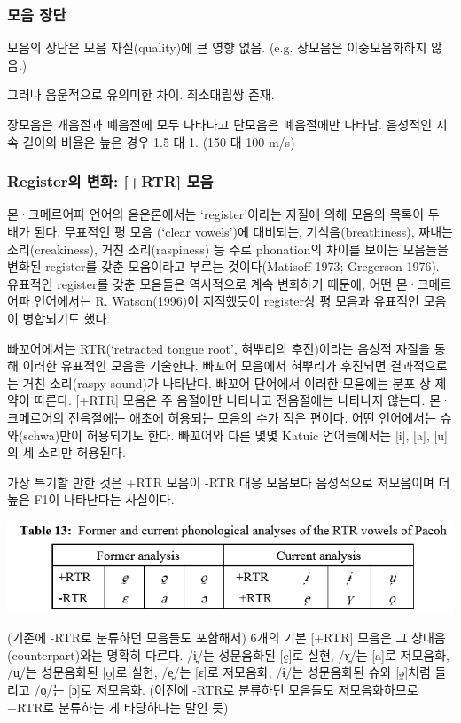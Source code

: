 \subsubsection{모음 장단}
모음의 장단은 모음 자질(quality)에 큰 영향 없음. (e.g. 장모음은 이중모음화하지 않음.)

그러나 음운적으로 유의미한 차이. 최소대립쌍 존재.

장모음은 개음절과 폐음절에 모두 나타나고 단모음은 폐음절에만 나타남. 음성적인 지속 길이의 비율은 높은 경우 1.5 대 1. (150 대 100 m/s)

\subsubsection{Register의 변화:  [+RTR] 모음}
몬·크메르어파 언어의 음운론에서는 `register'이라는 자질에 의해 모음의 목록이 두 배가 된다. 무표적인 평 모음 (`clear vowels')에 대비되는, 기식음(breathiness), 짜내는 소리(creakiness), 거친 소리(raspiness) 등 주로 phonation의 차이를 보이는 모음들을 변화된 register를 갖춘 모음이라고 부르는 것이다(Matisoff 1973; Gregerson 1976). 유표적인 register를 갖춘 모음들은 역사적으로 계속 변화하기 때문에, 어떤 몬·크메르어파 언어에서는 R. Watson(1996)이 지적했듯이 register상 평 모음과 유표적인 모음이 병합되기도 했다.

빠꼬어에서는 RTR(`retracted tongue root', 혀뿌리의 후진)이라는 음성적 자질을 통해 이러한 유표적인 모음을 기술한다. 빠꼬어 모음에서 혀뿌리가 후진되면 결과적으로는 거친 소리(raspy sound)가 나타난다. 빠꼬어 단어에서 이러한 모음에는 분포 상 제약이 따른다. [+RTR] 모음은 주 음절에만 나타나고 전음절에는 나타나지 않는다. 몬·크메르어의 전음절에는 애초에 허용되는 모음의 수가 적은 편이다. 어떤 언어에서는 슈와(schwa)만이 허용되기도 한다. 빠꼬어와 다른 몇몇 Katuic 언어들에서는 [i], [a], [u]의 세 소리만 허용된다.

가장 특기할 만한 것은 +RTR 모음이 -RTR 대응 모음보다 음성적으로 저모음이며 더 높은 F1이 나타난다는 사실이다.

\includegraphics{Pacoh/src/PacohTable13.png}

(기존에 -RTR로 분류하던 모음들도 포함해서) 6개의 기본 [+RTR] 모음은 그 상대음(counterpart)와는 명확히 다르다.
/i̙/는 성문음화된 [ḛ]로 실현, /ɤ̙/는 [a]로 저모음화, /u̙/는 성문음화된 [o̰]로 실현, /e̙/는 [ɛ]로 저모음화, /ɨ̙/는 성문음화된 슈와 [ə̰]처럼 들리고 /o̙/는 [ɔ]로 저모음화.
(이전에 -RTR로 분류하던 모음들도 저모음화하므로 +RTR로 분류하는 게 타당하다는 말인 듯)

